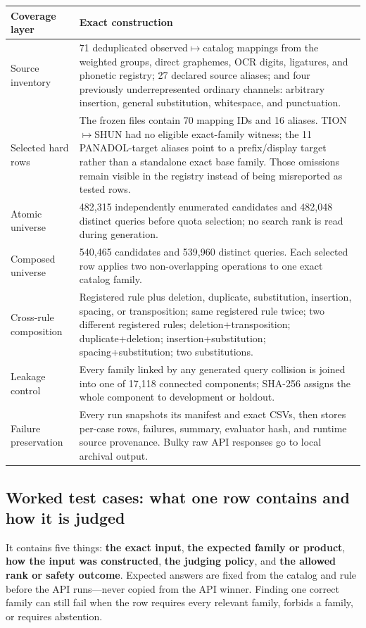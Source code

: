 \documentclass[10pt,a4paper]{article}
\begin{document}
\begin{tabularx}{\textwidth}{@{}L{43mm}Y@{}}
\toprule
Coverage layer & Exact construction \\
\midrule
Source inventory & 71 deduplicated observed$\mapsto$catalog mappings from the
weighted groups, direct graphemes, OCR digits, ligatures, and phonetic
registry; 27 declared source aliases; and four previously underrepresented
ordinary channels: arbitrary insertion, general substitution, whitespace, and
punctuation. \\
Selected hard rows & The frozen files contain 70 mapping IDs and 16 aliases.
TION$\mapsto$SHUN had no eligible exact-family witness; the 11 PANADOL-target
aliases point to a prefix/display target rather than a standalone exact base
family. Those omissions remain visible in the registry instead of being
misreported as tested rows. \\
Atomic universe & 482,315 independently enumerated candidates and 482,048
distinct queries before quota selection; no search rank is read during generation. \\
Composed universe & 540,465 candidates and 539,960 distinct queries. Each
selected row applies two non-overlapping operations to one exact catalog family. \\
Cross-rule composition & Registered rule plus deletion, duplicate,
substitution, insertion, spacing, or transposition; same registered rule twice;
two different registered rules; deletion+transposition; duplicate+deletion;
insertion+substitution; spacing+substitution; two substitutions. \\
Leakage control & Every family linked by any generated query collision is
joined into one of 17,118 connected components; SHA-256 assigns the whole
component to development or holdout. \\
Failure preservation & Every run snapshots its manifest and exact CSVs, then
stores per-case rows, failures, summary, evaluator hash, and runtime source
provenance. Bulky raw API responses go to local archival output. \\
\bottomrule
\end{tabularx}

\subsection{Worked test cases: what one row contains and how it is judged}

\begin{takeaway}[title=One test case is a frozen contract]
It contains five things: \textbf{the exact input}, \textbf{the expected
family or product}, \textbf{how the input was constructed}, \textbf{the
judging policy}, and \textbf{the allowed rank or safety outcome}. Expected
answers are fixed from the catalog and rule before the API runs---never copied
from the API winner. Finding one correct family can still fail when the row
requires every relevant family, forbids a family, or requires abstention.
\end{takeaway}
\end{document}

